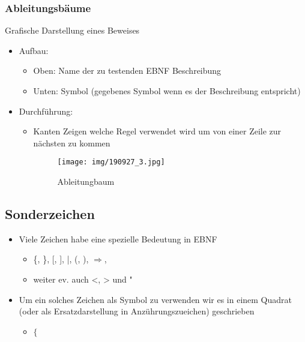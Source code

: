 \documentclass[11pt]{article}
\begin{document}
\subsubsection{Ableitungsbäume}
\label{sec:orgef61d57}
Grafische Darstellung eines Beweises\\

\begin{itemize}
\item Aufbau:\\
\begin{itemize}
\item Oben: Name der zu testenden EBNF Beschreibung\\
\item Unten: Symbol (gegebenes Symbol wenn es der Beschreibung entspricht)\\
\end{itemize}

\item Durchführung:\\
\begin{itemize}
\item Kanten Zeigen welche Regel verwendet wird um von einer Zeile zur nächsten zu kommen\\
\begin{figure}[htbp]
\centering
\texttt{[image: img/190927\_3.jpg]}
\caption{Ableitungbaum}
\end{figure}
\end{itemize}
\end{itemize}

\subsection{Sonderzeichen}
\label{sec:org1ed7352}
\begin{itemize}
\item Viele Zeichen habe eine spezielle Bedeutung in EBNF\\
\begin{itemize}
\item \{, \}, [, ], |, (, ), \(\Rightarrow\),\\
\item weiter ev. auch <, > und  "\\
\end{itemize}
\item Um ein solches Zeichen als Symbol zu verwenden wir es in einem Quadrat (oder als Ersatzdarstellung in Anzührungszueichen) geschrieben\\
\begin{itemize}
\item \(\boxed{\{}\)\\
\end{itemize}
\end{itemize}
\end{document}
